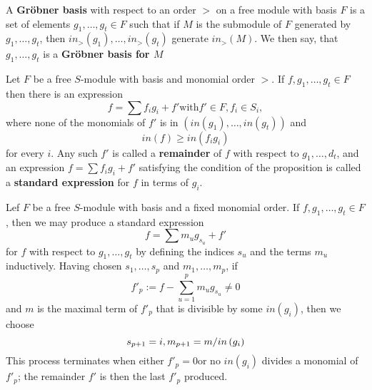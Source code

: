 \documentclass{article}
\begin{document}



\begin{defn}
	A \textbf{Gr\"obner basis} with respect to an order \(  > \) on a free module with basis \( F\) is a set of elements \( g_1, \dots , g_t \in F \) such that if \( M \) is the submodule of \( F \) generated by \( g_1 , \dots,g_t \), then \( in_{>} \left(  g_1 \right),\dots, in_{>} \left( g_t \right) \) generate \( in_{>} \left( M \right)\).
	We then say, that \( g_1, \dots, g_t \) is a \textbf{ Gr\"obner basis for \( M \) }
\end{defn}
\begin{propdef}[ \nocite{Eis1}{15.6}]
	Let \( F \) be a free \( S \)-module with basis and monomial order \( > \). If \( f,g_1,\dots,g_t \in F \) then there is an expression
	\[
		f= \sum f_i g_i +f' \text{with} f' \in F, f_i \in S_i ,
	\]
	where none of the monomials of \( f'\) is in 
	\( \left( in(g_1),\dots,in(g_t) \right) \) and
	\[
		in\left( f \right) \ge in\left( f_i g_i  \right)
	\]
	for every \( i \). Any such \( f' \) is called a \textbf{remainder} of \( f \) with respect to \( g_1,\dots,d_t \), and an expression 
	\( f=\sum f_i g_i + f' \)
	satisfying the condition of the proposition is called a \textbf{standard expression} for \( f \) in terms of \( g_i \).
\end{propdef}
\begin{algo}
	Lef \( F \) be a free \( S\)-module with basis and a fixed monomial order. 
	If 
	\( f,g_1,\dots,g_t \in F \)
	, then we may produce a standard expression
	\[
		f=\sum m_u g_{s_u} +f'
	\]
	for \(f\) with respect to 
	\( g_1,\dots,g_t \)
	by defining the indices \(s_u\)
	and the terms \(m_u\) inductively.
	Having chosen 
	\( s_1,\dots,s_p \)
	and 
	\( m_1,\dots,m_p\),
	if 
	\[
		f'_p:=f-\sum_{u=1}^{p} m_u g_{s_u} \neq 0
	\]
and \( m \) is the maximal term of \(f'_p \) that is divisible by some \( in\left( g_i \right) \),
then we choose
	\[
		s_{p+1}=i , \\
		m_{p+1}=m / in\left( g_i \right)
	\]
	This process terminates when either 
	\( f'_p=0 \)or no \( in\left( g_i \right) \) divides a monomial of 
	\( f'_p\);
	the remainder \(f'\) is then the last \( f'_p \) produced.
\end{algo}
\end{document}
